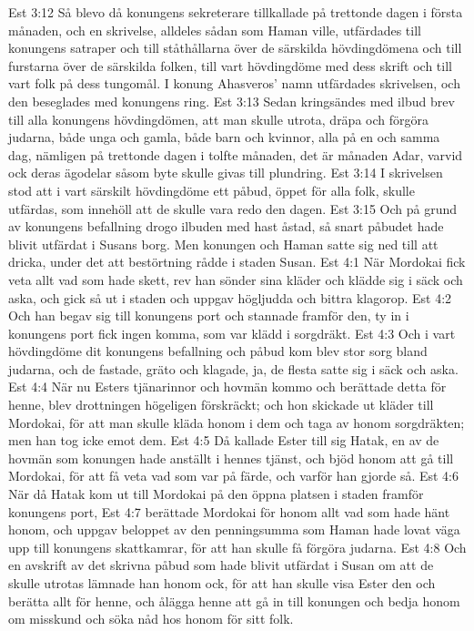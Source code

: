 Est 3:12  Så blevo då konungens sekreterare tillkallade på trettonde dagen i första månaden, och en skrivelse, alldeles sådan som Haman ville, utfärdades till konungens satraper och till ståthållarna över de särskilda hövdingdömena och till furstarna över de särskilda folken, till vart hövdingdöme med dess skrift och till vart folk på dess tungomål. I konung Ahasveros' namn utfärdades skrivelsen, och den beseglades med konungens ring.
Est 3:13  Sedan kringsändes med ilbud brev till alla konungens hövdingdömen, att man skulle utrota, dräpa och förgöra judarna, både unga och gamla, både barn och kvinnor, alla på en och samma dag, nämligen på trettonde dagen i tolfte månaden, det är månaden Adar, varvid ock deras ägodelar såsom byte skulle givas till plundring.
Est 3:14  I skrivelsen stod att i vart särskilt hövdingdöme ett påbud, öppet för alla folk, skulle utfärdas, som innehöll att de skulle vara redo den dagen.
Est 3:15  Och på grund av konungens befallning drogo ilbuden med hast åstad, så snart påbudet hade blivit utfärdat i Susans borg. Men konungen och Haman satte sig ned till att dricka, under det att bestörtning rådde i staden Susan.
Est 4:1  När Mordokai fick veta allt vad som hade skett, rev han sönder sina kläder och klädde sig i säck och aska, och gick så ut i staden och uppgav högljudda och bittra klagorop.
Est 4:2  Och han begav sig till konungens port och stannade framför den, ty in i konungens port fick ingen komma, som var klädd i sorgdräkt.
Est 4:3  Och i vart hövdingdöme dit konungens befallning och påbud kom blev stor sorg bland judarna, och de fastade, gräto och klagade, ja, de flesta satte sig i säck och aska.
Est 4:4  När nu Esters tjänarinnor och hovmän kommo och berättade detta för henne, blev drottningen högeligen förskräckt; och hon skickade ut kläder till Mordokai, för att man skulle kläda honom i dem och taga av honom sorgdräkten; men han tog icke emot dem.
Est 4:5  Då kallade Ester till sig Hatak, en av de hovmän som konungen hade anställt i hennes tjänst, och bjöd honom att gå till Mordokai, för att få veta vad som var på färde, och varför han gjorde så.
Est 4:6  När då Hatak kom ut till Mordokai på den öppna platsen i staden framför konungens port,
Est 4:7  berättade Mordokai för honom allt vad som hade hänt honom, och uppgav beloppet av den penningsumma som Haman hade lovat väga upp till konungens skattkamrar, för att han skulle få förgöra judarna.
Est 4:8  Och en avskrift av det skrivna påbud som hade blivit utfärdat i Susan om att de skulle utrotas lämnade han honom ock, för att han skulle visa Ester den och berätta allt för henne, och ålägga henne att gå in till konungen och bedja honom om misskund och söka nåd hos honom för sitt folk.
